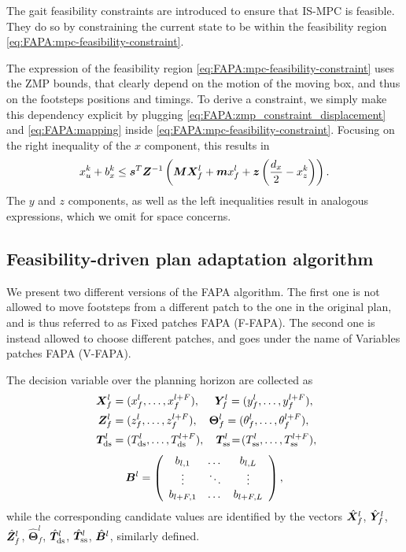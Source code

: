 The gait feasibility constraints are introduced to ensure that IS-MPC is feasible. They do so by constraining the current state to be within the feasibility region \eqref{eq:FAPA:mpc-feasibility-constraint}.

The expression of the feasibility region \eqref{eq:FAPA:mpc-feasibility-constraint} uses the ZMP bounds, that clearly depend on the motion of the moving box, and thus on the footsteps positions and timings. To derive a constraint, we simply make this dependency explicit by plugging \eqref{eq:FAPA:zmp_constraint_displacement} and \eqref{eq:FAPA:mapping} inside \eqref{eq:FAPA:mpc-feasibility-constraint}. Focusing on the right inequality of the $x$ component, this results in
\begin{equation}\label{eq:FAPA:gait_feasibility_constraint}
x_u^k + b_x^k \le \bm{s}^T \bm{Z}^{-1} \left({\bm{M}}{\bm{X}}_f^l + {\bm{m}} x_f^l + \bm{z} \left(\frac{d_x}{2} - x_z^k\right)\right).
\end{equation}
The $y$ and $z$ components, as well as the left inequalities result in analogous expressions, which we omit for space concerns.

\subsection{Feasibility-driven plan adaptation algorithm}

We present two different versions of the FAPA algorithm. The first one is not allowed to move footsteps from a different patch to the one in the original plan, and is thus referred to as Fixed patches FAPA (F-FAPA). The second one is instead allowed to choose different patches, and goes under the name of Variables patches FAPA (V-FAPA).

The decision variable over the planning horizon are collected as
\begin{align*}
    {\bm{X}}_f^l & =  (x_f^l,\dots,x_f^{l+F}), \quad 
    \,\, {\bm{Y}}_f^l  =  (y_f^l,\dots,y_f^{l+F}), \\
    \,\, {\bm{Z}}_f^l & = (z_f^l,\dots,z_f^{l+F}), \quad
    \bm{\Theta}_f^l = (\theta_f^l,\dots,\theta_f^{l+F}), \\
    \,\, {\bm{T}}_{\rm ds}^l & =  (T_{\rm ds}^l,\dots,T_{\rm ds}^{l+F}), \quad {\bm{T}}_{\rm ss}^l \!=\! (T_{\rm ss}^l,\dots,T_{\rm ss}^{l+F}), 
\end{align*}
\begin{equation*}
{\bm{B}}^l = \left(
\begin{array}{ccc}b_{l,1} & \dots & b_{l,L}\\ \vdots & \ddots & \vdots \\ b_{l+F,1} & \dots & b_{l+F,L} \end{array}
\right),
\end{equation*}
while the corresponding candidate values are identified by the vectors $\hat {{\bm{X}}}_f^l$, $\hat {{\bm{Y}}}_f^l$, $\hat {{\bm{Z}}}_f^l$, $\hat {\bm{\Theta}}_f^l$, $\hat {{\bm{T}}}^l_{\rm ds}$, $\hat {{\bm{T}}}^l_{\rm ss}$, $\hat {{\bm{B}}}^l$, similarly defined.

